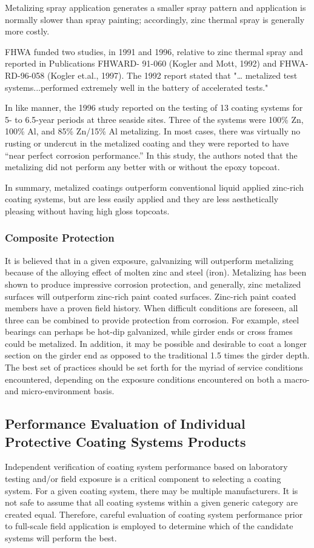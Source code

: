 Metalizing spray application generates a smaller spray pattern and application is normally slower than spray
painting; accordingly, zinc thermal spray is generally more costly.

FHWA funded two studies, in 1991 and 1996, relative to zinc thermal spray and reported in Publications FHWARD-
91-060 (Kogler and Mott, 1992) and FHWA-RD-96-058 (Kogler et.al., 1997). The 1992 report stated that "…
metalized test systems...performed extremely well in the battery of accelerated tests."

In like manner, the 1996 study reported on the testing of 13 coating systems for 5- to 6.5-year periods at three
seaside sites. Three of the systems were 100\% Zn, 100\% Al, and 85\% Zn/15\% Al metalizing. In most cases, there
was virtually no rusting or undercut in the metalized coating and they were reported to have “near perfect corrosion performance.” In this study, the authors noted that the metalizing did not perform any better with or without the
epoxy topcoat.

In summary, metalized coatings outperform conventional liquid applied zinc-rich coating systems, but are less
easily applied and they are less aesthetically pleasing without having high gloss topcoats.

\subsubsection{Composite Protection}
It is believed that in a given exposure, galvanizing will outperform metalizing because of the alloying effect of
molten zinc and steel (iron). Metalizing has been shown to produce impressive corrosion protection, and generally,
zinc metalized surfaces will outperform zinc-rich paint coated surfaces. Zinc-rich paint coated members have a
proven field history. When difficult conditions are foreseen, all three can be combined to provide protection from
corrosion. For example, steel bearings can perhaps be hot-dip galvanized, while girder ends or cross frames could be
metalized. In addition, it may be possible and desirable to coat a longer section on the girder end as opposed to the
traditional 1.5 times the girder depth. The best set of practices should be set forth for the myriad of service conditions
encountered, depending on the exposure conditions encountered on both a macro- and micro-environment basis.


\subsection{Performance Evaluation of Individual Protective Coating Systems Products}
\label{subsec:evaluation-protective-coating}
Independent verification of coating system performance based on laboratory testing and/or field exposure is a
critical component to selecting a coating system. For a given coating system, there may be multiple manufacturers. It
is not safe to assume that all coating systems within a given generic category are created equal. Therefore, careful
evaluation of coating system performance prior to full-scale field application is employed to determine which of the
candidate systems will perform the best.

